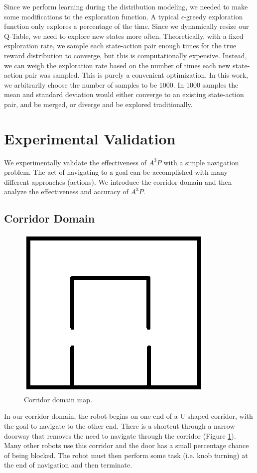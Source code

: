 \documentclass[letterpaper, 10 pt, conference]{ieeeconf}  %
\begin{document}
Since we perform learning during the distribution modeling, we needed to make some modifications to the exploration function. A typical $\epsilon$-greedy exploration function only explores a percentage of the time. Since we dynamically resize our Q-Table, we need to explore new states more often. Theoretically, with a fixed exploration rate, we sample each state-action pair enough times for the true reward distribution to converge, but this is computationally expensive. Instead, we can weigh the exploration rate based on the number of times each new state-action pair was sampled. This is purely a convenient optimization. In this work, we arbitrarily choose the number of samples to be 1000. In 1000 samples the mean and standard deviation would either converge to an existing state-action pair, and be merged, or diverge and be explored traditionally.

\section{Experimental Validation}

We experimentally validate the effectiveness of $A^3P$ with a simple navigation problem. The act of navigating to a goal can be accomplished with many different approaches (actions). We introduce the corridor domain and then analyze the effectiveness and accuracy of $A^3P$.

\subsection{Corridor Domain}
\begin{figure}
\centering
\includegraphics[width=0.5\columnwidth]{Corridor}
\caption{Corridor domain map.}
\label{Corridor}
\end{figure}

In our corridor domain, the robot begins on one end of a U-shaped corridor, with the goal to navigate to the other end. There is a shortcut through a narrow doorway that removes the need to navigate through the corridor (Figure \ref{Corridor}). Many other robots use this corridor and the door has a small percentage chance of being blocked. The robot must then perform some task (i.e. knob turning) at the end of navigation and then terminate.
\end{document}
